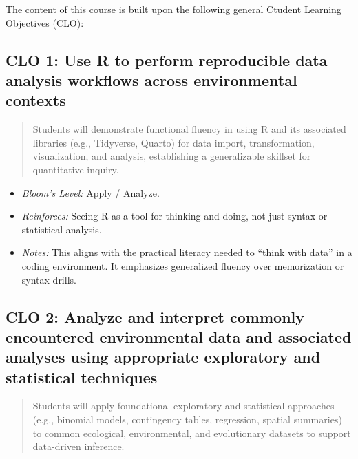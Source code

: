 \documentclass[
  letterpaper,
]{book}
\providecommand{\tightlist}{%
  \setlength{\itemsep}{0pt}\setlength{\parskip}{0pt}}
\begin{document}
The content of this course is built upon the following general Ctudent
Learning Objectives (CLO):

\subsection*{CLO 1: Use R to perform reproducible data analysis
workflows across environmental
contexts}\label{clo-1-use-r-to-perform-reproducible-data-analysis-workflows-across-environmental-contexts}

\begin{quote}
Students will demonstrate functional fluency in using R and its
associated libraries (e.g., Tidyverse, Quarto) for data import,
transformation, visualization, and analysis, establishing a
generalizable skillset for quantitative inquiry.
\end{quote}

\begin{itemize}
\tightlist
\item
  \emph{Bloom's Level:} Apply / Analyze.
\item
  \emph{Reinforces:} Seeing R as a tool for thinking and doing, not just
  syntax or statistical analysis.
\item
  \emph{Notes:} This aligns with the practical literacy needed to
  ``think with data'' in a coding environment. It emphasizes generalized
  fluency over memorization or syntax drills.
\end{itemize}

\subsection*{CLO 2: Analyze and interpret commonly encountered
environmental data and associated analyses using appropriate exploratory
and statistical
techniques}\label{clo-2-analyze-and-interpret-commonly-encountered-environmental-data-and-associated-analyses-using-appropriate-exploratory-and-statistical-techniques}

\begin{quote}
Students will apply foundational exploratory and statistical approaches
(e.g., binomial models, contingency tables, regression, spatial
summaries) to common ecological, environmental, and evolutionary
datasets to support data-driven inference.
\end{quote}
\end{document}
